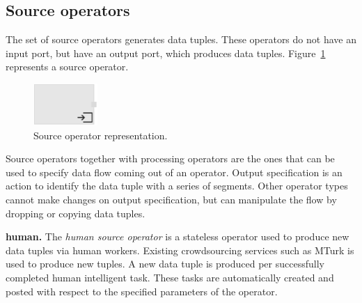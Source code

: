 \subsection{Source operators}
The set of source operators generates data tuples. These operators do not have 
an input port, but have an output port, which produces data tuples. Figure~\ref{fig:source operator} 
represents a source operator.

\begin{figure}[ht]
	\centering
	\includegraphics[height=60px]{figures/SourceOperator.pdf}
	\caption{Source operator representation.}
	\label{fig:source operator}
\end{figure}

Source operators together with processing operators are the ones that can be 
used to specify data flow coming out of an operator. Output specification is an 
action to identify the data tuple with a series of segments. Other operator types 
cannot make changes on output specification, but can manipulate the flow by dropping 
or copying data tuples.

\textbf{human.} 
The \textit{human source operator} is a stateless operator used to produce new data tuples 
via human workers. Existing crowdsourcing services such as MTurk is used 
to produce new tuples. A new data tuple is produced per successfully completed 
human intelligent task. These tasks are automatically created and posted with 
respect to the specified parameters of the operator.

